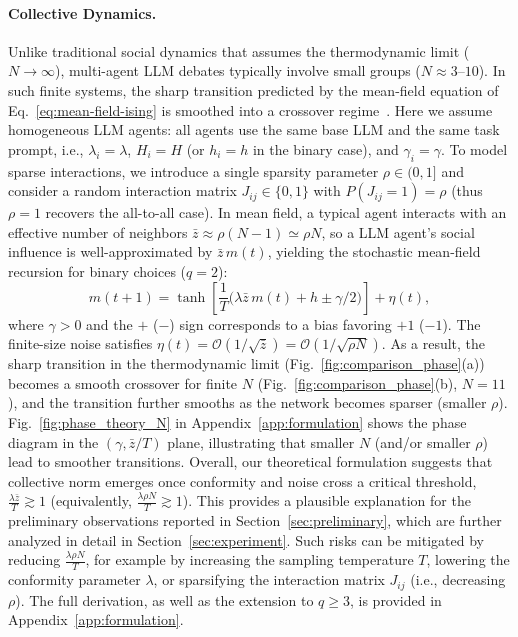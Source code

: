 \documentclass{article}
\theoremstyle{plain}
\theoremstyle{definition}
\theoremstyle{remark}
\begin{document}
\paragraph{Collective Dynamics.}
Unlike traditional social dynamics that assumes the thermodynamic limit ($N\to\infty$), multi-agent LLM debates typically involve small groups ($N\approx 3\text{--}10$).
In such finite systems, the sharp transition predicted by the mean-field equation of Eq.~\eqref{eq:mean-field-ising} is smoothed into a crossover regime~\citep{PhysRevB.30.322}. 
Here we assume homogeneous LLM agents: all agents use the same base LLM and the same task prompt, i.e., 
$\lambda_i=\lambda$, $H_i=H$ (or $h_i=h$ in the binary case), and $\gamma_i=\gamma$. 
To model sparse interactions, we introduce a single sparsity parameter $\rho\in(0,1]$ and consider a random interaction matrix 
$J_{ij}\in\{0,1\}$ with $P(J_{ij}=1)=\rho$ (thus $\rho=1$ recovers the all-to-all case).
In mean field, a typical agent interacts with an effective number of neighbors $\bar{z}\approx \rho (N-1)\simeq \rho N$,
so a LLM agent's social influence is well-approximated by $\bar{z}\,m(t)$, yielding the stochastic mean-field recursion for binary choices ($q=2$): 
\begin{equation}\label{eq:stochastic-mf}
m(t+1)=\tanh\!\left[\frac{1}{T}\bigl(\lambda \bar{z}\, m(t)+h \pm \gamma/2\bigr)\right]+\eta(t),
\end{equation}
where $\gamma>0$ and the $+$ ($-$) sign corresponds to a bias favoring $+1$ ($-1$).
The finite-size noise satisfies $\eta(t)=\mathcal{O}(1/\sqrt{\bar{z}})=\mathcal{O}(1/\sqrt{\rho N})$. 
As a result, the sharp transition in the thermodynamic limit (Fig.~\ref{fig:comparison_phase}(a)) becomes a smooth crossover
for finite $N$ (Fig.~\ref{fig:comparison_phase}(b), $N=11$), and the transition further smooths as the network becomes sparser (smaller $\rho$).
Fig.~\ref{fig:phase_theory_N} in Appendix~\ref{app:formulation} shows the phase diagram in the $(\gamma, \bar{z}/T)$ plane, 
illustrating that smaller $N$ (and/or smaller $\rho$) lead to smoother transitions. 
Overall, our theoretical formulation suggests that collective norm emerges once conformity and noise cross a critical threshold,
$\frac{\lambda \bar{z}}{T} \gtrsim 1$ (equivalently, $\frac{\lambda \rho N}{T}\gtrsim 1$). 
This provides a plausible explanation for the preliminary observations reported in Section~\ref{sec:preliminary}, which are further analyzed in detail
in Section~\ref{sec:experiment}. Such risks can be mitigated by reducing $\frac{\lambda \rho N}{T}$, for example by increasing the sampling temperature $T$,
lowering the conformity parameter $\lambda$, or sparsifying the interaction matrix $J_{ij}$ (i.e., decreasing $\rho$). 
The full derivation, as well as the extension to $q\geq 3$, is provided in Appendix~\ref{app:formulation}. 
\end{document}
